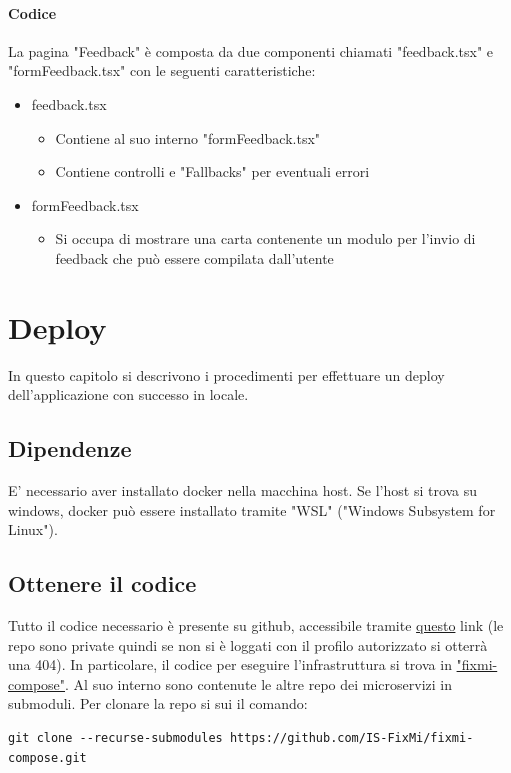 \documentclass{report}
\begin{document}
\subsubsection*{Codice}
La pagina "Feedback" è composta da due componenti chiamati "feedback.tsx" e "formFeedback.tsx" con le seguenti caratteristiche:
\begin{itemize}
	\item feedback.tsx
	\begin{itemize}
		\item Contiene al suo interno "formFeedback.tsx"
		\item Contiene controlli e "Fallbacks" per eventuali errori
	\end{itemize}
	\item formFeedback.tsx
	\begin{itemize}
		\item Si occupa di mostrare una carta contenente un modulo per l'invio di feedback che può essere compilata dall'utente
	\end{itemize}
\end{itemize}

\chapter{Deploy}

In questo capitolo si descrivono i procedimenti per effettuare un deploy dell'applicazione con successo in locale.

\section{Dipendenze}
E' necessario aver installato docker nella macchina host. Se l'host si trova su windows, docker può essere installato tramite "WSL" ("Windows Subsystem for Linux").


\section{Ottenere il codice}
Tutto il codice necessario è presente su github, accessibile tramite \href{https://github.com/orgs/IS-FixMi/repositories}{questo} link (le repo sono private quindi se non si è loggati con il profilo autorizzato si otterrà una 404). In particolare, il codice per eseguire l'infrastruttura si trova in \href{https://github.com/IS-FixMi/fixmi-compose}{"fixmi-compose"}. Al suo interno sono contenute le altre repo dei microservizi in submoduli. Per clonare la repo si sui il comando:
\begin{verbatim}
git clone --recurse-submodules https://github.com/IS-FixMi/fixmi-compose.git
\end{verbatim}
\end{document}
